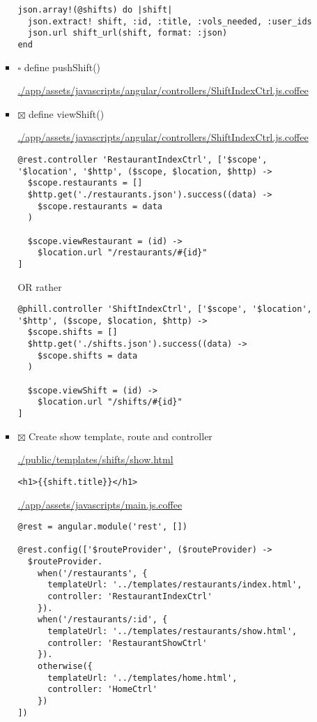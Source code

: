 \documentclass[11pt]{article}
\begin{document}
\begin{itemize}
\begin{itemize}
\begin{itemize}
\begin{verbatim}
json.array!(@shifts) do |shift|
  json.extract! shift, :id, :title, :vols_needed, :user_ids
  json.url shift_url(shift, format: :json)
end
\end{verbatim}

\item $\square$ define pushShift()

\url{./app/assets/javascripts/angular/controllers/ShiftIndexCtrl.js.coffee}

\item $\boxtimes$ define viewShift()

\url{./app/assets/javascripts/angular/controllers/ShiftIndexCtrl.js.coffee}

\begin{verbatim}
@rest.controller 'RestaurantIndexCtrl', ['$scope', '$location', '$http', ($scope, $location, $http) ->
  $scope.restaurants = []
  $http.get('./restaurants.json').success((data) ->
    $scope.restaurants = data
  )

  $scope.viewRestaurant = (id) ->
    $location.url "/restaurants/#{id}"
]
\end{verbatim}

OR rather

\begin{verbatim}
@phill.controller 'ShiftIndexCtrl', ['$scope', '$location', '$http', ($scope, $location, $http) ->
  $scope.shifts = []
  $http.get('./shifts.json').success((data) ->
    $scope.shifts = data
  )

  $scope.viewShift = (id) ->
    $location.url "/shifts/#{id}"        
]
\end{verbatim}

\item $\boxtimes$ Create show template, route and controller

\url{./public/templates/shifts/show.html}

\begin{verbatim}
<h1>{{shift.title}}</h1>
\end{verbatim}

\url{./app/assets/javascripts/main.js.coffee}

\begin{verbatim}
@rest = angular.module('rest', [])

@rest.config(['$routeProvider', ($routeProvider) ->
  $routeProvider.
    when('/restaurants', {
      templateUrl: '../templates/restaurants/index.html',
      controller: 'RestaurantIndexCtrl'
    }).
    when('/restaurants/:id', {
      templateUrl: '../templates/restaurants/show.html',
      controller: 'RestaurantShowCtrl'
    }).
    otherwise({
      templateUrl: '../templates/home.html',
      controller: 'HomeCtrl'
    })
])
\end{verbatim}


\end{itemize}
\end{itemize}
\end{itemize}
\end{document}
